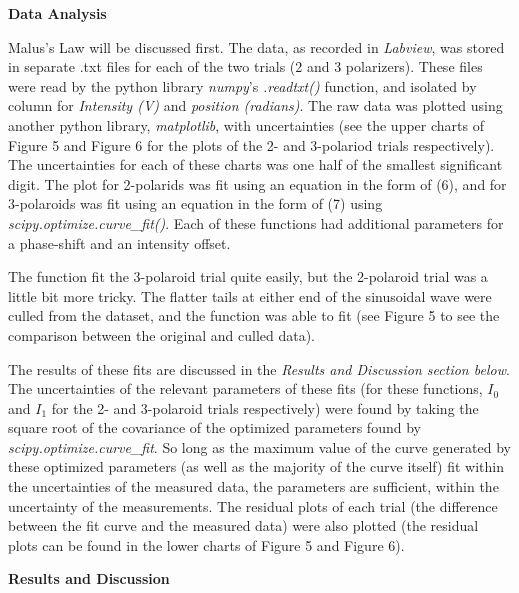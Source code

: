 \documentclass[11pt]{article}
\begin{document}
\begin{multicols}{2}
    \vspace{10pt}

     \selectfont \textbf{Data Analysis}
    
     \selectfont 
    
    Malus's Law will be discussed first. The data, as recorded in \textit{Labview}, was stored in separate .txt files for each of the two trials (2 and 3 polarizers). 
    These files were read by the python library \textit{numpy}'s \textit{.readtxt()} function, and isolated by column for \textit{Intensity (V)} and \textit{position (radians)}.
    The raw data was plotted using another python library, \textit{matplotlib}, with uncertainties (see the upper charts of Figure 5 and Figure 6 for the plots of the 2- and 3-polariod trials respectively).
    The uncertainties for each of these charts was one half of the smallest significant digit.
    The plot for 2-polarids was fit using an equation in the form of (6), and for 3-polaroids was fit using an equation in the form of (7) using \textit{scipy.optimize.curve\_fit()}. 
    Each of these functions had additional parameters for a phase-shift and an intensity offset.  

    The function fit the 3-polaroid trial quite easily, but the 2-polaroid trial was a little bit more tricky. The flatter tails at either end of the sinusoidal wave were culled from the dataset, and the function was able to fit (see Figure 5 to see the comparison between the original and culled data). 

    The results of these fits are discussed in the \textit{Results and Discussion section below}. The uncertainties of the relevant parameters of these fits (for these functions, $I_0$ and $I_1$ for the 2- and 3-polaroid trials respectively) were found by taking the square root of the covariance of the optimized parameters found by \textit{scipy.optimize.curve\_fit}. So long as the maximum value of the curve generated by these optimized parameters (as well as the majority of the curve itself) fit within the uncertainties of the measured data, the parameters are sufficient, within the uncertainty of the measurements. The residual plots of each trial (the difference between the fit curve and the measured data) were also plotted (the residual plots can be found in the lower charts of Figure 5 and Figure 6).
    
    
    \vspace{10pt}

     \selectfont \textbf{Results and Discussion}
    

\end{multicols}
\end{document}
